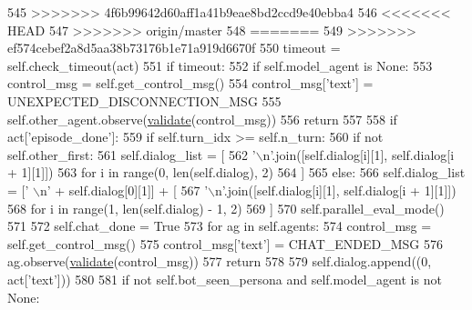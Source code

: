 \begin{DoxyCode}
545 >>>>>>> 4f6b99642d60aff1a41b9eae8bd2ccd9e40ebba4
546 <<<<<<< HEAD
547 >>>>>>> origin/master
548 =======
549 >>>>>>> ef574cebef2a8d5aa38b73176b1e71a919d6670f
550         timeout = self.check\_timeout(act)
551         \textcolor{keywordflow}{if} timeout:
552             \textcolor{keywordflow}{if} self.model\_agent \textcolor{keywordflow}{is} \textcolor{keywordtype}{None}:
553                 control\_msg = self.get\_control\_msg()
554                 control\_msg[\textcolor{stringliteral}{'text'}] = UNEXPECTED\_DISCONNECTION\_MSG
555                 self.other\_agent.observe(\hyperlink{namespaceparlai_1_1core_1_1worlds_afc3fad603b7bce41dbdc9cdc04a9c794}{validate}(control\_msg))
556             \textcolor{keywordflow}{return}
557 
558         \textcolor{keywordflow}{if} act[\textcolor{stringliteral}{'episode\_done'}]:
559             \textcolor{keywordflow}{if} self.turn\_idx >= self.n\_turn:
560                 \textcolor{keywordflow}{if} \textcolor{keywordflow}{not} self.other\_first:
561                     self.dialog\_list = [
562                         \textcolor{stringliteral}{'\(\backslash\)n'}.join([self.dialog[i][1], self.dialog[i + 1][1]])
563                         \textcolor{keywordflow}{for} i \textcolor{keywordflow}{in} range(0, len(self.dialog), 2)
564                     ]
565                 \textcolor{keywordflow}{else}:
566                     self.dialog\_list = [\textcolor{stringliteral}{' \(\backslash\)n'} + self.dialog[0][1]] + [
567                         \textcolor{stringliteral}{'\(\backslash\)n'}.join([self.dialog[i][1], self.dialog[i + 1][1]])
568                         \textcolor{keywordflow}{for} i \textcolor{keywordflow}{in} range(1, len(self.dialog) - 1, 2)
569                     ]
570                 self.parallel\_eval\_mode()
571 
572                 self.chat\_done = \textcolor{keyword}{True}
573                 \textcolor{keywordflow}{for} ag \textcolor{keywordflow}{in} self.agents:
574                     control\_msg = self.get\_control\_msg()
575                     control\_msg[\textcolor{stringliteral}{'text'}] = CHAT\_ENDED\_MSG
576                     ag.observe(\hyperlink{namespaceparlai_1_1core_1_1worlds_afc3fad603b7bce41dbdc9cdc04a9c794}{validate}(control\_msg))
577             \textcolor{keywordflow}{return}
578 
579         self.dialog.append((0, act[\textcolor{stringliteral}{'text'}]))
580 
581         \textcolor{keywordflow}{if} \textcolor{keywordflow}{not} self.bot\_seen\_persona \textcolor{keywordflow}{and} self.model\_agent \textcolor{keywordflow}{is} \textcolor{keywordflow}{not} \textcolor{keywordtype}{None}:

\end{DoxyCode}
